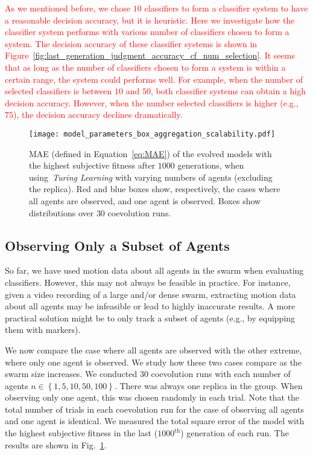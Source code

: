 \textcolor{red}{As we mentioned before, we chose $10$ classifiers to form a classifier system to have a reasonable decision accuracy, but it is heuristic. Here we investigate how the classifier system performs with various number of classifiers chosen to form a system. The decision accuracy of these classifier systems is shown in Figure~\ref{fig:last_generation_judgment_accuracy_cf_num_selection}. It seems that as long as the number of classifiers chosen to form a system is within a certain range, the system could performs well. For example, when the number of selected classifiers is between $10$ and $50$, both classifier systems can obtain a high decision accuracy. However, when the number selected classifiers is higher (e.g., $75$), the decision accuracy declines dramatically.}
%
\begin{figure}[!t]%
	\centering
	\texttt{[image: model\_parameters\_box\_aggregation\_scalability.pdf]}
	\caption{MAE (defined in Equation~\eqref{eq:MAE}) of the evolved models with the highest subjective fitness after $1000$ generations, when using~\textit{Turing Learning} with varying numbers of agents (excluding the replica). Red and blue boxes show, respectively, the cases where all agents are observed, and one agent is observed. Boxes show distributions over $30$ coevolution runs. }
	\label{fig:model_parameters_box_aggregation_scalability}
\end{figure}
%
\subsection{Observing Only a Subset of Agents}\label{sec:observing_a_subset_agents_swarm_simulation}
So far, we have used motion data about all agents in the swarm when evaluating classifiers. However, this may not always be feasible in practice. For instance, given a video recording of a large and/or dense swarm, extracting motion data about all agents may be infeasible or lead to highly inaccurate results. A more practical solution might be to only track a subset of agents (e.g., by equipping them with markers).

We now compare the case where all agents are observed with the other extreme, where only one agent is observed. We study how these two cases compare as the swarm size increases. We conducted $30$ coevolution runs with each number of agents $n\in\left\{1, 5, 10, 50, 100\right\}$. There was always one replica in the group. When observing only one agent, this was chosen randomly in each trial. Note that the total number of trials in each coevolution run for the case of observing all agents and one agent is identical. We measured the total square error of the model with the highest subjective fitness in the last ($1000^\textrm{th}$) generation of each run. The results are shown in Fig.~\ref{fig:model_parameters_box_aggregation_scalability}.


